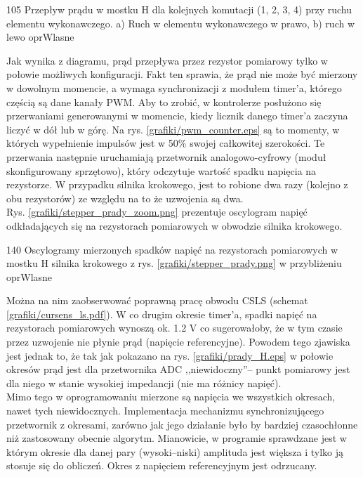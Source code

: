 	{105}
	{Przepływ prądu w mostku H dla kolejnych komutacji (1, 2, 3, 4) przy ruchu elementu wykonawczego. a) Ruch w elementu wykonawczego w prawo, b) ruch w lewo}
	{oprWlasne}

Jak wynika z diagramu, prąd przepływa przez rezystor pomiarowy tylko w połowie możliwych konfiguracji. Fakt ten sprawia, że prąd nie może być mierzony w dowolnym momencie, a wymaga synchronizacji z modułem timer'a, którego częścią są dane kanały PWM. Aby to zrobić, w kontrolerze posłużono się przerwaniami generowanymi w momencie, kiedy licznik danego timer'a zaczyna liczyć w dół lub w górę. Na rys. \ref{grafiki/pwm_counter.eps} są to momenty, w których wypełnienie impulsów jest w 50\% swojej całkowitej szerokości. Te przerwania następnie uruchamiają przetwornik analogowo-cyfrowy (moduł skonfigurowany sprzętowo), który odczytuje wartość spadku napięcia na rezystorze. W przypadku silnika krokowego, jest to robione dwa razy (kolejno z obu rezystorów) ze względu na to że uzwojenia są dwa. \\

Rys. \ref{grafiki/stepper_prady_zoom.png} prezentuje oscylogram napięć odkładających się na rezystorach pomiarowych w obwodzie silnika krokowego. 

	{140}
	{Oscylogramy mierzonych spadków napięć na rezystorach pomiarowych w mostku H silnika krokowego z rys. \ref{grafiki/stepper_prady.png} w przybliżeniu}
	{oprWlasne}
	
Można na nim zaobserwować poprawną pracę obwodu CSLS (schemat \ref{grafiki/cursens_ls.pdf}). W co drugim okresie timer'a, spadki napięć na rezystorach pomiarowych wynoszą ok. 1.2 V co sugerowałoby, że w tym czasie przez uzwojenie nie płynie prąd (napięcie referencyjne). Powodem tego zjawiska jest jednak to, że tak jak pokazano na rys. \ref{grafiki/prady_H.eps} w połowie okresów prąd jest dla przetwornika ADC ,,niewidoczny''-- punkt pomiarowy jest dla niego w stanie wysokiej impedancji (nie ma różnicy napięć). \\

Mimo tego w oprogramowaniu mierzone są napięcia we wszystkich okresach, nawet tych niewidocznych. Implementacja mechanizmu synchronizującego przetwornik z okresami, zarówno jak jego działanie było by bardziej czasochłonne niż zastosowany obecnie algorytm. Mianowicie, w programie sprawdzane jest w którym okresie dla danej pary (wysoki--niski) amplituda jest większa i tylko ją stosuje się do obliczeń. Okres z napięciem referencyjnym jest odrzucany. \\

